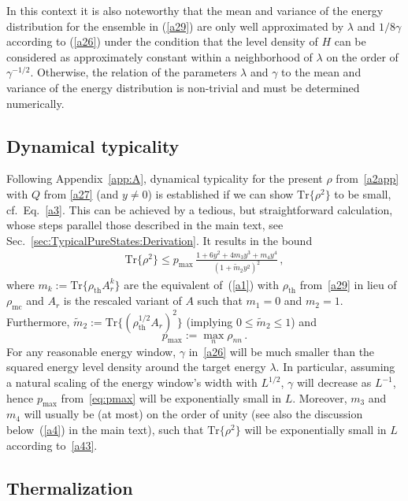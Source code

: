 \documentclass[twocolumn,aps,prb,floatfix,superscriptaddress]{revtex4-2}
\newcommand{\<}{\left\langle}	%
\renewcommand{\>}{\right\rangle}	%
\newcommand{\pmax}{p_{\mathrm{max}}}
\newcommand{\tr}{\mbox{Tr}}
\newcommand{\rhomic}{\rho_{\mathrm{mc}}}
\newcommand{\rhoth}{\rho_{\mathrm{th}}}
\newcommand{\mref}[1]{\ref{#1}}
\begin{document}
In this context it is also noteworthy 
that the mean and variance of the energy
distribution for the ensemble in (\ref{a29})
are only well approximated by $\lambda$ and 
$1/8\gamma$ according to (\ref{a26}) under the 
condition that the level density of $H$ can
be considered as approximately constant within
a neighborhood of $\lambda$ on the order of 
$\gamma^{-1/2}$. 
Otherwise, the relation of the
parameters $\lambda$ and $\gamma$ to
the mean and variance of the energy 
distribution is non-trivial and must be
determined numerically.

\subsection{Dynamical typicality}

Following Appendix~\ref{app:A},
dynamical typicality for the present $\rho$ from~\eqref{a2app} with $Q$ from \eqref{a27}
(and $y \neq 0$)
is established if we can show $\tr\{\rho^2\}$ to be small,
cf.\ Eq.~\eqref{a3}.
This can be achieved by a tedious, but straightforward calculation,
whose steps parallel those described in the main text,
see Sec.~\ref{sec:TypicalPureStates:Derivation}.
It results in the bound
\begin{eqnarray}
\tr\{\rho^2\} \leq \pmax\, \frac{1+6y^2+4m_3y^3+m_4y^4}{(1+\tilde m_2 y^2)^2} \,,
\label{a43}
\end{eqnarray}
where $m_k := \tr\{ \rhoth A^k_r \}$ are the equivalent of~(\mref{a1}) with $\rhoth$ from~\eqref{a29} in lieu of $\rhomic$
and $A_r$ is the rescaled variant of $A$ such that $m_1 = 0$ and $m_2 = 1$.
Furthermore, $\tilde m_2 := \tr\{ (\rhoth^{1/2} A_r)^2 \}$ (implying $0 \leq \tilde m_2 \leq 1$) and
\begin{equation}
\label{eq:pmax}
	p_{\max} := \max_n \rho_{nn} \,.
\end{equation}
For any reasonable energy window, $\gamma$ in~\eqref{a26} will be much smaller 
than the squared energy level density around the target energy $\lambda$.
In particular, assuming a natural scaling of the energy window's width with $L^{1/2}$, 
$\gamma$ will decrease as $L^{-1}$,
hence $p_{\max}$ from~\eqref{eq:pmax} will be exponentially small in $L$.
Moreover, $m_3$ and $m_4$ will usually be (at most) on the order of unity 
(see also the discussion below~(\mref{a4}) in the main text),
such that
$\tr\{\rho^2\}$ will be exponentially small in $L$ according to~\eqref{a43}.


\subsection{Thermalization}
\label{app:B:Thermalization}
\end{document}
